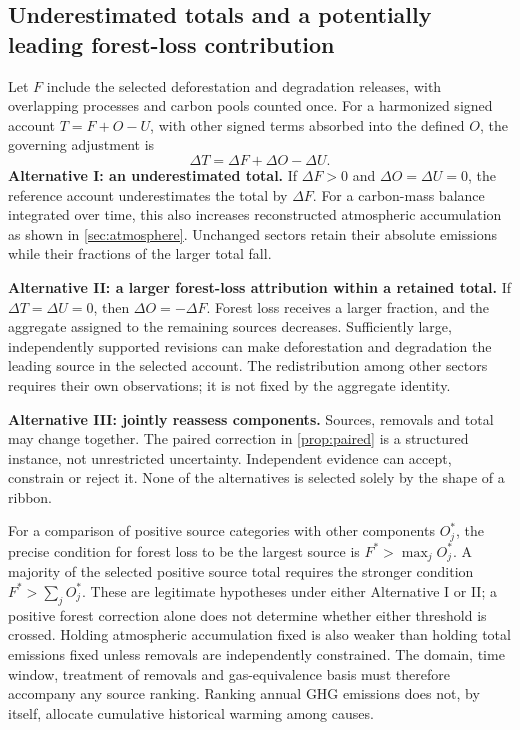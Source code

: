\documentclass[11pt,a4paper]{article}
\theoremstyle{remark}
\begin{document}
\subsection{Underestimated totals and a potentially leading forest-loss contribution}
Let $F$ include the selected deforestation and degradation releases, with overlapping processes and carbon pools counted once. For a harmonized signed account $T=F+O-U$, with other signed terms absorbed into the defined $O$, the governing adjustment is
\begin{equation}
\Delta T=\Delta F+\Delta O-\Delta U.
\label{eq:account}
\end{equation}
\textbf{Alternative I: an underestimated total.} If $\Delta F>0$ and $\Delta O=\Delta U=0$, the reference account underestimates the total by $\Delta F$. For a carbon-mass balance integrated over time, this also increases reconstructed atmospheric accumulation as shown in \cref{sec:atmosphere}. Unchanged sectors retain their absolute emissions while their fractions of the larger total fall.

\textbf{Alternative II: a larger forest-loss attribution within a retained total.} If $\Delta T=\Delta U=0$, then $\Delta O=-\Delta F$. Forest loss receives a larger fraction, and the aggregate assigned to the remaining sources decreases. Sufficiently large, independently supported revisions can make deforestation and degradation the leading source in the selected account. The redistribution among other sectors requires their own observations; it is not fixed by the aggregate identity.

\textbf{Alternative III: jointly reassess components.} Sources, removals and total may change together. The paired correction in \cref{prop:paired} is a structured instance, not unrestricted uncertainty. Independent evidence can accept, constrain or reject it. None of the alternatives is selected solely by the shape of a ribbon.

For a comparison of positive source categories with other components $O_j^*$, the precise condition for forest loss to be the largest source is $F^*>\max_jO_j^*$. A majority of the selected positive source total requires the stronger condition $F^*>\sum_jO_j^*$. These are legitimate hypotheses under either Alternative I or II; a positive forest correction alone does not determine whether either threshold is crossed. Holding atmospheric accumulation fixed is also weaker than holding total emissions fixed unless removals are independently constrained. The domain, time window, treatment of removals and gas-equivalence basis must therefore accompany any source ranking. Ranking annual GHG emissions does not, by itself, allocate cumulative historical warming among causes.
\end{document}
